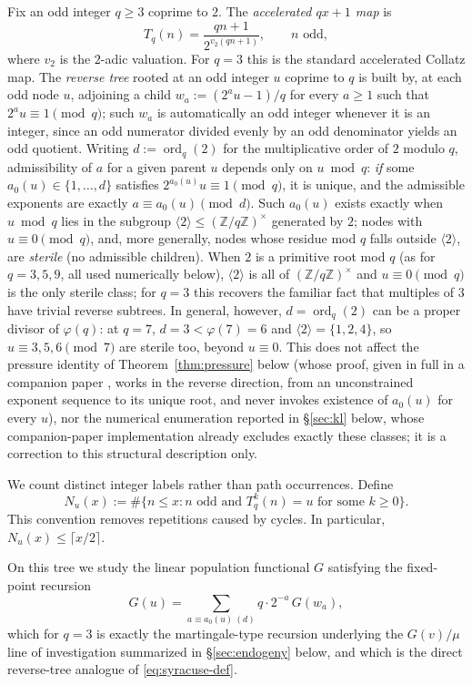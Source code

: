 \documentclass[11pt]{article}
\theoremstyle{definition}
\theoremstyle{remark}
\DeclareMathOperator{\ord}{ord}
\begin{document}
Fix an odd integer $q\ge 3$ coprime to $2$. The \emph{accelerated
$qx+1$ map} is
\[
  T_q(n) = \frac{qn+1}{2^{v_2(qn+1)}}, \qquad n \text{ odd},
\]
where $v_2$ is the $2$-adic valuation. For $q=3$ this is the standard
accelerated Collatz map. The \emph{reverse tree} rooted at an odd
integer $u$ coprime to $q$ is built by, at each odd node $u$, adjoining
a child $w_a := (2^a u - 1)/q$ for every $a\ge 1$ such that
$2^a u \equiv 1 \pmod q$; such $w_a$ is automatically an odd integer
whenever it is an integer, since an odd numerator divided evenly by an
odd denominator yields an odd quotient. Writing $d:=\ord_q(2)$ for the
multiplicative order of $2$ modulo $q$, admissibility of $a$ for a
given parent $u$ depends only on $u\bmod q$: \emph{if} some
$a_0(u)\in\{1,\dots,d\}$ satisfies $2^{a_0(u)}u\equiv 1\pmod q$, it is
unique, and the admissible exponents are exactly $a\equiv a_0(u)\pmod
d$. Such $a_0(u)$ exists exactly when $u\bmod q$ lies in the subgroup
$\langle2\rangle\le(\mathbb{Z}/q\mathbb{Z})^\times$ generated by $2$;
nodes with $u\equiv 0\pmod q$, and, more generally, nodes whose residue
mod $q$ falls outside $\langle2\rangle$, are \emph{sterile} (no
admissible children). When $2$ is a primitive root mod $q$ (as for
$q=3,5,9$, all used numerically below), $\langle2\rangle$ is all of
$(\mathbb{Z}/q\mathbb{Z})^\times$ and $u\equiv 0\pmod q$ is the only
sterile class; for $q=3$ this recovers the familiar fact that
multiples of $3$ have trivial reverse subtrees. In general, however,
$d=\ord_q(2)$ can be a proper divisor of $\varphi(q)$: at $q=7$,
$d=3<\varphi(7)=6$ and $\langle2\rangle=\{1,2,4\}$, so $u\equiv
3,5,6\pmod7$ are sterile too, beyond $u\equiv 0$. This does not
affect the pressure identity of Theorem~\ref{thm:pressure} below (whose
proof, given in full in a companion paper \cite{PressureCompanion},
works in the reverse direction, from an unconstrained exponent
sequence to its unique root, and never invokes existence of
$a_0(u)$ for every $u$), nor the numerical enumeration reported in
\S\ref{sec:kl} below, whose companion-paper implementation
\cite{KLVolkovCompanion} already excludes exactly these classes; it is
a correction to this structural description only.

We count distinct integer labels rather than path occurrences. Define
\[
 N_u(x):=\#\{n\le x:n\text{ odd and }T_q^k(n)=u
                    \text{ for some }k\ge0\}.
\]
This convention removes repetitions caused by cycles. In particular,
$N_u(x)\le\lceil x/2\rceil$.

On this tree we study the linear population functional $G$ satisfying
the fixed-point recursion
\begin{equation}\label{eq:G-recursion}
  G(u) = \sum_{a \equiv a_0(u) \ (d)} q\cdot 2^{-a}\, G(w_a),
\end{equation}
which for $q=3$ is exactly the martingale-type recursion underlying the
$G(v)/\mu$ line of investigation summarized in \S\ref{sec:endogeny}
below, and which is the direct reverse-tree analogue of
\eqref{eq:syracuse-def}.
\end{document}
